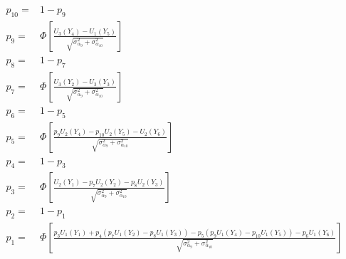 \documentclass{article}
\begin{document}
\begin{align*}
  p_{10} =& 1 - p_{9} \\    
  p_{9} =& \Phi
  \left[
    \frac{U_{3}(Y_{4}) - U_{1}(Y_{5})}
    {\sqrt{\sigma^{2}_{\alpha_{9}} + \sigma^{2}_{\alpha_{10}}}}
  \right] \\
  p_{8} =& 1 - p_{7} \\    
  p_{7} =& \Phi
  \left[
    \frac{U_{3}(Y_{2}) - U_{3}(Y_{3})}
    {\sqrt{\sigma^{2}_{\alpha_{9}} + \sigma^{2}_{\alpha_{10}}}}
  \right] \\
  p_{6} =& 1 - p_{5} \\
  p_{5} =& \Phi
  \left[
    \frac{p_{9}U_{2}(Y_{4}) - p_{10}U_{2}(Y_{5}) - U_{2}(Y_{6})}
    {\sqrt{\sigma^{2}_{\alpha_{9}} + \sigma^{2}_{\alpha_{10}}}}
  \right] \\
  p_{4} =& 1 - p_{3} \\
  p_{3} =& \Phi
  \left[
    \frac{U_{2}(Y_{1}) - p_{7}U_{2}(Y_{2}) - p_{8}U_{2}(Y_{3})}
    {\sqrt{\sigma^{2}_{\alpha_{9}} + \sigma^{2}_{\alpha_{10}}}}
  \right] \\
  p_{2} =& 1 - p_{1} \\
  p_{1} =& \Phi
  \left[
    \frac{p_{3}U_{1}(Y_{1}) + p_{4}
      \left(
        p_{7}U_{1}(Y_{2}) - p_{8}U_{1}(Y_{3})
      \right)
    - p_{5}
    \left(
      p_{9} U_{1}(Y_{4}) - p_{10} U_{1}(Y_{5})
    \right)
    - p_{6} U_{1}(Y_{6})
    }
    {\sqrt{\sigma^{2}_{\alpha_{9}} + \sigma^{2}_{\alpha_{10}}}}
  \right] 
\end{align*}


\end{document}
